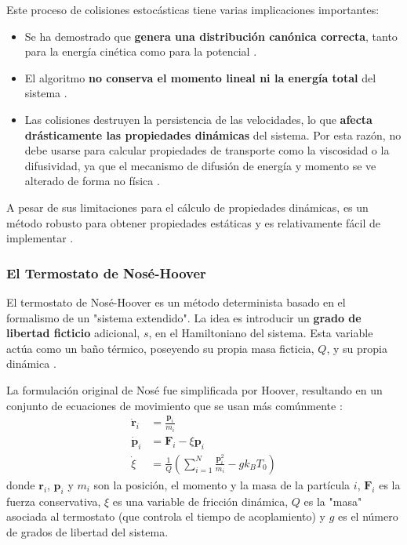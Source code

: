 Este proceso de colisiones estocásticas tiene varias implicaciones importantes:
\begin{itemize}
    \item Se ha demostrado que \textbf{genera una distribución canónica correcta}, tanto para la energía cinética como para la potencial \cite[758]{frenkel2002understanding}.
    \item El algoritmo \textbf{no conserva el momento lineal ni la energía total} del sistema \cite[758]{frenkel2002understanding}.
    \item Las colisiones destruyen la persistencia de las velocidades, lo que \textbf{afecta drásticamente las propiedades dinámicas} del sistema. Por esta razón, no debe usarse para calcular propiedades de transporte como la viscosidad o la difusividad, ya que el mecanismo de difusión de energía y momento se ve alterado de forma no física \cite[758, 759]{frenkel2002understanding}.
\end{itemize}
A pesar de sus limitaciones para el cálculo de propiedades dinámicas, es un método robusto para obtener propiedades estáticas y es relativamente fácil de implementar \cite[759]{frenkel2002understanding}.

\subsubsection{El Termostato de Nosé-Hoover}
El termostato de Nosé-Hoover es un método determinista basado en el formalismo de un "sistema extendido". La idea es introducir un \textbf{grado de libertad ficticio} adicional, $s$, en el Hamiltoniano del sistema. Esta variable actúa como un baño térmico, poseyendo su propia masa ficticia, $Q$, y su propia dinámica \cite[108]{zhou2022molecular}.

La formulación original de Nosé fue simplificada por Hoover, resultando en un conjunto de ecuaciones de movimiento que se usan más comúnmente \cite[692]{frenkel2002understanding}:
\begin{align}
\dot{\mathbf{r}}_i &= \frac{\mathbf{p}_i}{m_i} \\
\dot{\mathbf{p}}_i &= \mathbf{F}_i - \xi \mathbf{p}_i \\
\dot{\xi} &= \frac{1}{Q} \left( \sum_{i=1}^{N} \frac{\mathbf{p}_i^2}{m_i} - g k_B T_0 \right)
\end{align}
donde $\mathbf{r}_i$, $\mathbf{p}_i$ y $m_i$ son la posición, el momento y la masa de la partícula $i$, $\mathbf{F}_i$ es la fuerza conservativa, $\xi$ es una variable de fricción dinámica, $Q$ es la "masa" asociada al termostato (que controla el tiempo de acoplamiento) y $g$ es el número de grados de libertad del sistema.

